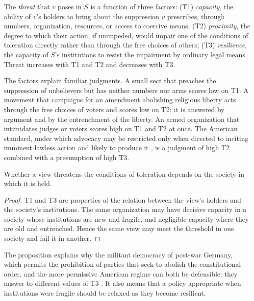 \documentclass{situationist-preprint}
\begin{document}
\begin{definition}\label{d:threat}
The \emph{threat} that $v$ poses in $S$ is a function of three factors: (T1) \emph{capacity}, the ability of $v$'s holders to bring about the suppression $v$ prescribes, through numbers, organization, resources, or access to coercive means; (T2) \emph{proximity}, the degree to which their action, if unimpeded, would impair one of the conditions of toleration directly rather than through the free choices of others; (T3) \emph{resilience}, the capacity of $S$'s institutions to resist the impairment by ordinary legal means. Threat increases with T1 and T2 and decreases with T3.
\end{definition}

The factors explain familiar judgments. A small sect that preaches the suppression of unbelievers but has neither numbers nor arms scores low on T1. A movement that campaigns for an amendment abolishing religious liberty acts through the free choices of voters and scores low on T2; it is answered by argument and by the entrenchment of the liberty. An armed organization that intimidates judges or voters scores high on T1 and T2 at once. The American standard, under which advocacy may be restricted only when directed to inciting imminent lawless action and likely to produce it \citep{Brandenburg1969}, is a judgment of high T2 combined with a presumption of high T3.

\begin{proposition}\label{p:relative}
Whether a view threatens the conditions of toleration depends on the society in which it is held.
\end{proposition}

\begin{proof}
T1 and T3 are properties of the relation between the view's holders and the society's institutions. The same organization may have decisive capacity in a society whose institutions are new and fragile, and negligible capacity where they are old and entrenched. Hence the same view may meet the threshold in one society and fail it in another.
\end{proof}

The proposition explains why the militant democracy of post-war Germany, which permits the prohibition of parties that seek to abolish the constitutional order, and the more permissive American regime can both be defensible: they answer to different values of T3 \citep{Loewenstein1937,Kirshner2014}. It also means that a policy appropriate when institutions were fragile should be relaxed as they become resilient.
\end{document}
